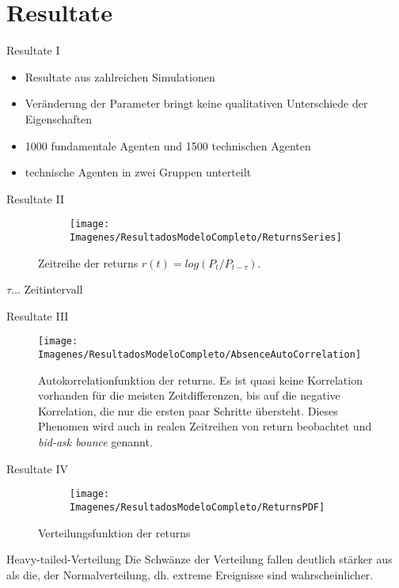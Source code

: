 \documentclass{beamer}
\begin{document}
\section{Resultate}	
	\begin{frame}{Resultate I}
		\begin{itemize}
			\item Resultate aus zahlreichen Simulationen 
			\item Veränderung der Parameter bringt keine qualitativen Unterschiede der Eigenschaften
			\item 1000 fundamentale Agenten und 1500 technischen Agenten
			\item technische Agenten in zwei Gruppen unterteilt
		\end{itemize}
	\end{frame}

	\begin{frame}{Resultate II}
		\begin{figure}[!h]
			\centering
			
			\begin{subfigure}[b]{0.7\textwidth}
				\texttt{[image: Imagenes/ResultadosModeloCompleto/ReturnsSeries]}
			
			\end{subfigure}
			
				\caption{Zeitreihe der returns $r(t)=log(P_t/P_{t-\tau})$.}
		\end{figure}
	$\tau \dots$ Zeitintervall\\
	\end{frame}

	\begin{frame}{Resultate III}
		\begin{figure}[!h]
			\centering
			\texttt{[image: Imagenes/ResultadosModeloCompleto/AbsenceAutoCorrelation]}
			\caption{Autokorrelationfunktion der returns. Es ist quasi keine Korrelation vorhanden für die meisten Zeitdifferenzen, bis auf die negative Korrelation, die nur die ersten paar Schritte übersteht. Dieses Phenomen wird auch in realen Zeitreihen von return beobachtet und \textit{bid-ask bounce} genannt. }
		\end{figure} 
	\end{frame}

	\begin{frame}{Resultate IV}
		\begin{figure}[!h]
			\centering
			\begin{subfigure}[b]{0.7\textwidth}
				\texttt{[image: Imagenes/ResultadosModeloCompleto/ReturnsPDF]}
			\end{subfigure}
			\caption{Verteilungsfunktion der returns}
		\end{figure}
		\begin{block}{Heavy-tailed-Verteilung}
			Die Schwänze der Verteilung fallen deutlich stärker aus als die, der Normalverteilung, dh. extreme Ereignisse sind wahrscheinlicher.
		\end{block}
	\end{frame}
\end{document}

